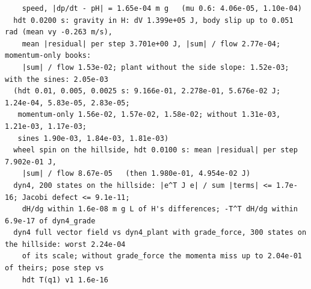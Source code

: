 \documentclass[11pt]{article}
\theoremstyle{remark}
\begin{document}
\begin{center}
\begin{minipage}{0.98\linewidth}
\begin{verbatim}
    speed, |dp/dt - pH| = 1.65e-04 m g   (mu 0.6: 4.06e-05, 1.10e-04)
  hdt 0.0200 s: gravity in H: dV 1.399e+05 J, body slip up to 0.051 rad (mean vy -0.263 m/s),
    mean |residual| per step 3.701e+00 J, |sum| / flow 2.77e-04; momentum-only books:
    |sum| / flow 1.53e-02; plant without the side slope: 1.52e-03; with the sines: 2.05e-03
  (hdt 0.01, 0.005, 0.0025 s: 9.166e-01, 2.278e-01, 5.676e-02 J; 1.24e-04, 5.83e-05, 2.83e-05;
   momentum-only 1.56e-02, 1.57e-02, 1.58e-02; without 1.31e-03, 1.21e-03, 1.17e-03;
   sines 1.90e-03, 1.84e-03, 1.81e-03)
  wheel spin on the hillside, hdt 0.0100 s: mean |residual| per step 7.902e-01 J,
    |sum| / flow 8.67e-05   (then 1.980e-01, 4.954e-02 J)
  dyn4, 200 states on the hillside: |e^T J e| / sum |terms| <= 1.7e-16; Jacobi defect <= 9.1e-11;
    dH/dg within 1.6e-08 m g L of H's differences; -T^T dH/dg within 6.9e-17 of dyn4_grade
  dyn4 full vector field vs dyn4_plant with grade_force, 300 states on the hillside: worst 2.24e-04
    of its scale; without grade_force the momenta miss up to 2.04e-01 of theirs; pose step vs
    hdt T(q1) v1 1.6e-16
\end{verbatim}
\end{minipage}
\end{center}
\end{document}
